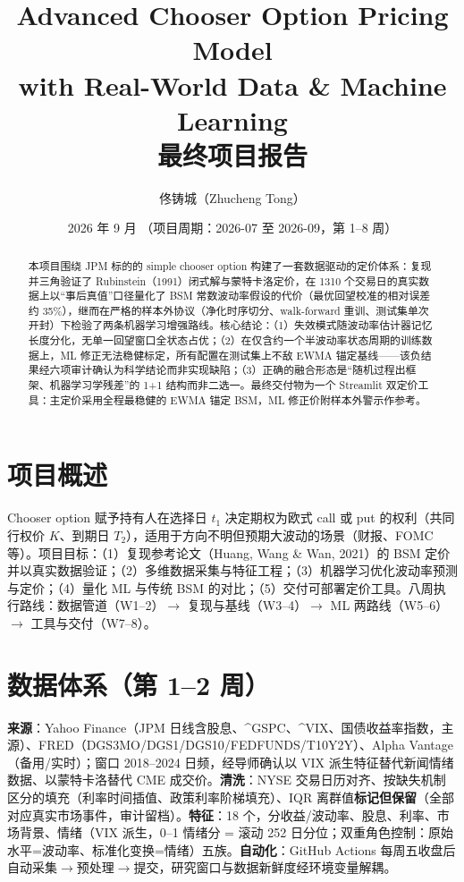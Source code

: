 \documentclass[11pt]{ctexart}
\title{\textbf{Advanced Chooser Option Pricing Model\\ with Real-World Data \& Machine Learning}\\
\Large 最终项目报告}
\author{佟铸城（Zhucheng Tong）}
\date{2026 年 9 月 \quad（项目周期：2026-07 至 2026-09，第 1--8 周）}
\begin{document}
\maketitle

\begin{abstract}
本项目围绕 JPM 标的的 simple chooser option 构建了一套数据驱动的定价体系：复现并三角验证了 Rubinstein（1991）闭式解与蒙特卡洛定价，在 1310 个交易日的真实数据上以“事后真值”口径量化了 BSM 常数波动率假设的代价（最优回望校准的相对误差约 35\%），继而在严格的样本外协议（净化时序切分、walk-forward 重训、测试集单次开封）下检验了两条机器学习增强路线。核心结论：（1）失效模式随波动率估计器记忆长度分化，无单一回望窗口全状态占优；（2）在仅含约一个半波动率状态周期的训练数据上，ML 修正无法稳健标定，所有配置在测试集上不敌 EWMA 锚定基线——该负结果经六项审计确认为科学结论而非实现缺陷；（3）正确的融合形态是“随机过程出框架、机器学习学残差”的 1+1 结构而非二选一。最终交付物为一个 Streamlit 双定价工具：主定价采用全程最稳健的 EWMA 锚定 BSM，ML 修正价附样本外警示作参考。
\end{abstract}

{\small\setlength{\parskip}{0pt}\tableofcontents}
\newpage

\section{项目概述}
Chooser option 赋予持有人在选择日 $t_1$ 决定期权为欧式 call 或 put 的权利（共同行权价 $K$、到期日 $T_2$），适用于方向不明但预期大波动的场景（财报、FOMC 等）。项目目标：（1）复现参考论文（Huang, Wang \& Wan, 2021）的 BSM 定价并以真实数据验证；（2）多维数据采集与特征工程；（3）机器学习优化波动率预测与定价；（4）量化 ML 与传统 BSM 的对比；（5）交付可部署定价工具。八周执行路线：数据管道（W1--2）$\to$ 复现与基线（W3--4）$\to$ ML 两路线（W5--6）$\to$ 工具与交付（W7--8）。

\section{数据体系（第 1--2 周）}
\textbf{来源}：Yahoo Finance（JPM 日线含股息、\^{}GSPC、\^{}VIX、国债收益率指数，主源）、FRED（DGS3MO/DGS1/DGS10/FEDFUNDS/T10Y2Y）、Alpha Vantage（备用/实时）；窗口 2018--2024 日频，经导师确认以 VIX 派生特征替代新闻情绪数据、以蒙特卡洛替代 CME 成交价。\textbf{清洗}：NYSE 交易日历对齐、按缺失机制区分的填充（利率时间插值、政策利率阶梯填充）、IQR 离群值\textbf{标记但保留}（全部对应真实市场事件，审计留档）。\textbf{特征}：18 个，分收益/波动率、股息、利率、市场背景、情绪（VIX 派生，0--1 情绪分 = 滚动 252 日分位；双重角色控制：原始水平=波动率、标准化变换=情绪）五族。\textbf{自动化}：GitHub Actions 每周五收盘后自动采集$\to$预处理$\to$提交，研究窗口与数据新鲜度经环境变量解耦。
\end{document}
